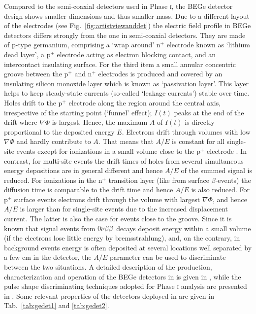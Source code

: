 Compared to the semi-coaxial detectors used in {\gerda} Phase \textsc{i}, the BEGe detector design shows smaller dimensions and thus smaller mass. Due to a different layout of the electrodes (see Fig.~\ref{fig:artistviewanddet}) the electric field profile in BEGe detectors differs strongly from the one in semi-coaxial detectors. They are made of p-type germanium, comprising a `wrap around' n$^+$ electrode known as `lithium dead layer', a p$^+$ electrode acting as electron blocking contact, and an intercontact insulating surface. For the third item a small annular concentric groove between the p$^+$ and n$^+$ electrodes is produced and covered by an insulating silicon monoxide layer which is known as `passivation layer'. This layer helps to keep steady-state currents (so-called `leakage currents') stable over time. Holes drift to the p$^+$ electrode along the region around the central axis, irrespective of the starting point (`funnel' effect); $I(t)$ peaks at the end of the drift where $\nabla\Phi$ is largest. Hence, the maximum $A$ of $I(t)$ is directly proportional to the deposited energy $E$. Electrons drift through volumes with low $\nabla\Phi$ and hardly contribute to $A$. That means that $A/E$ is constant for all single-site events except for ionizations in a small volume close to the p$^+$ electrode \cite{PSD1, PSD2, PSD3}. In contrast, for multi-site events the drift times of holes from several simultaneous energy depositions are in general different and hence $A/E$ of the summed signal is reduced. For ionizations in the n$^+$ transition layer (like from surface $\beta$-events) the diffusion time is comparable to the drift time and hence $A/E$ is also reduced. For p$^+$ surface events electrons drift through the volume with largest $\nabla\Phi$, and hence $A/E$ is larger than for single-site events due to the increased displacement current. The latter is also the case for events close to the groove. Since it is known that signal events from $0\nu\beta\beta$ decays deposit energy within a small volume (if the electrons lose little energy by bremsstrahlung), and, on the contrary, in background events energy is often deposited at several locations well separated by a few cm in the detector, the $A/E$ parameter can be used to discriminate between the two situations. A detailed description of the production, characterization and operation of the BEGe detectors in {\gerda} is given in \cite{detectors}, while the pulse shape discriminating techniques adopted for Phase \textsc{i} analysis are presented in \cite{PSDgerda}. Some relevant properties of the detectors deployed in {\gerda} are given in Tab.~\ref{tab:gedet1} and \ref{tab:gedet2}.

